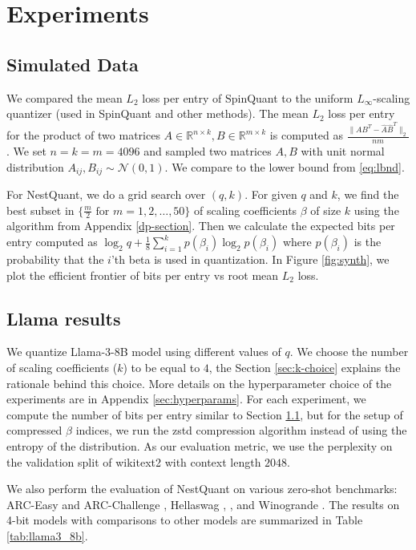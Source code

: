 \section{Experiments}\label{sec:exper}
\subsection{Simulated Data}\label{sec:synth}
    We compared the mean $L_2$ loss per entry of SpinQuant to the uniform $L_\infty$-scaling quantizer (used in SpinQuant and other methods).
    The mean $L_2$ loss per entry for the product of two matrices $A \in \mathbb{R}^{n\times k}, B\in \mathbb{R}^{m\times k}$ is computed as $\frac{\lVert AB^T - \hat{A}\hat{B}^T\rVert_2}{nm}$.
    We set $n=k=m=4096$ and sampled two matrices $A,B$ with unit normal distribution $A_{ij},B_{ij} \sim \mathcal{N}(0,1)$. 
    We compare to the lower bound from \eqref{eq:lbnd}.

For NestQuant, we do a grid search over $(q, k)$. For given $q$ and $k$, we find the best subset in $\{\frac{m}{2} \text{ for } m = 1, 2, \ldots, 50\}$ of scaling coefficients $\beta$ of size $k$ using the algorithm from Appendix \ref{dp-section}. Then we calculate the expected bits per entry computed as $\log_2{q}+\frac{1}{8}\sum_{i=1}^kp(\beta_{i})\log_2 p(\beta_{i})$ where $p(\beta_{i})$ is the probability that the $i$'th beta is used in quantization. In Figure \ref{fig:synth}, we plot the efficient frontier of bits per entry vs root mean $L_2$ loss.

\subsection{Llama results}

We quantize Llama-3-8B model \cite{grattafiori2024llama3herdmodels} using different values of $q$. We choose the number of scaling coefficients ($k$) to be equal to $4$, the Section \ref{sec:k-choice} explains the rationale behind this choice. More details on the hyperparameter choice of the experiments are in Appendix \ref{sec:hyperparams}. For each experiment, we compute the number of bits per entry similar to Section \ref{sec:synth}, but for the setup of compressed $\beta$ indices, we run the zstd compression algorithm instead of using the entropy of the distribution. As our evaluation metric, we use the perplexity on the validation split of wikitext2 with context length $2048$.

We also perform the evaluation of NestQuant on various zero-shot benchmarks: ARC-Easy and ARC-Challenge \cite{clark2018arc}, Hellaswag \cite{zellers2019}, \cite{bisk2019piqa}, and Winogrande \cite{sakaguchi2019winogrande}. The results on 4-bit models with comparisons to other models are summarized in Table \ref{tab:llama3_8b}.


